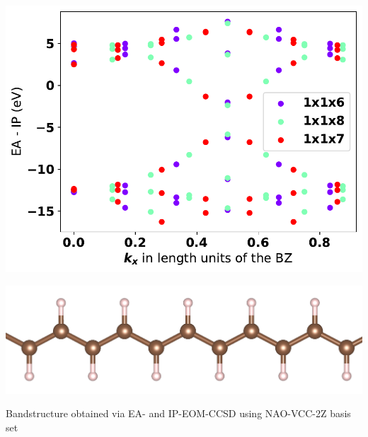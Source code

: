 \begin{poster}
{\begin{minipage}{0.7\linewidth}
\includegraphics[scale=0.45]{bilder/bandstructure.pdf}
\end{minipage}
\hspace{0.4cm}
\begin{minipage}{0.2\linewidth}
  \begin{center}
  \includegraphics[scale=0.04, angle=90]{bilder/polyacetylene_centered_long_cropped_2nd.png}
  \end{center}
\end{minipage}

    \begin{center}
     Bandstructure obtained via EA- and IP-EOM-CCSD\cite{stanton1993equation} using 
     NAO-VCC-2Z basis set
     \end{center}

}
\end{poster}
